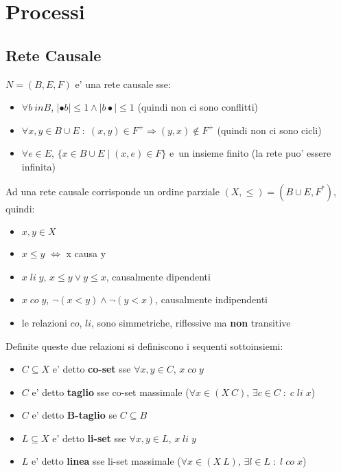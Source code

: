 \chapter{Processi}

\section{Rete Causale}

$N = (B, E, F)$ e' una rete causale sse:
\begin{itemize}
    \item $\forall b \ in B$, $|\bullet b| \leq 1 \land |b \bullet| \leq 1$ (quindi non ci sono conflitti)
    \item $\forall x,y \in B \cup E \; : \; (x, y) \in F^+ \Rightarrow (y, x) \notin F^+$ (quindi non ci sono cicli)
    \item $\forall e \in E$, $\{ x \in B \cup E \; | \; (x, e) \in F \}$ e\ un insieme finito (la rete puo' essere infinita)
\end{itemize}

Ad una rete causale corrisponde un ordine parziale $(X, \leq) = (B \cup E, F^*)$, quindi:

\begin{itemize}
    \item $x,y \in X$
    \item $x \leq y$ $\Leftrightarrow$ x causa y
    \item $x \; li \; y$, $x \leq y \lor y \leq x$, causalmente dipendenti
    \item $x \; co \; y$, $\neg (x < y) \land \neg (y < x)$, causalmente indipendenti
    \item le relazioni $co$, $li$, sono simmetriche, riflessive ma \textbf{non} transitive
\end{itemize}

Definite queste due relazioni si definiscono i sequenti sottoinsiemi:

\begin{itemize}
    \item $C \subseteq X$ e' detto \textbf{co-set} sse $\forall x,y \in C$, $x \; co \; y$
    \item $C$ e' detto \textbf{taglio} sse co-set massimale ($\forall x \in (X \ C)$, $\exists c \in C \; : \; c \; li \; x$)
    \item $C$ e' detto \textbf{B-taglio} se $C \subseteq B$
    \item $L \subseteq X$ e' detto \textbf{li-set} sse $\forall x,y \in L$, $x \; li \; y$
    \item $L$ e' detto \textbf{linea} sse li-set massimale ($\forall x \in (X \ L)$, $\exists l \in L \; : \; l \; co \; x$)
\end{itemize}

